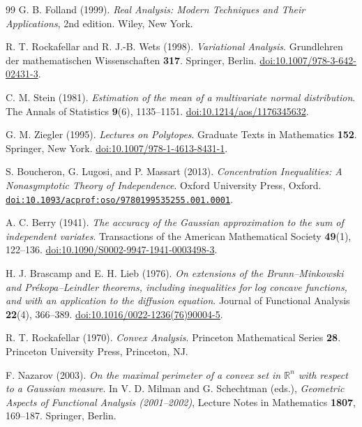 \documentclass[11pt,letterpaper]{article}
\theoremstyle{remark}
\newcommand{\R}{\mathbb R}
\begin{document}
\begin{thebibliography}{99}
G. B. Folland (1999).
\emph{Real Analysis: Modern Techniques and Their Applications}, 2nd edition.
Wiley, New York.

R. T. Rockafellar and R. J.-B. Wets (1998).
\emph{Variational Analysis}.
Grundlehren der mathematischen Wissenschaften \textbf{317}.
Springer, Berlin.
\href{https://doi.org/10.1007/978-3-642-02431-3}{doi:10.1007/978-3-642-02431-3}.

C. M. Stein (1981).
\emph{Estimation of the mean of a multivariate normal distribution}.
The Annals of Statistics \textbf{9}(6), 1135--1151.
\href{https://doi.org/10.1214/aos/1176345632}{doi:10.1214/aos/1176345632}.

G. M. Ziegler (1995).
\emph{Lectures on Polytopes}.
Graduate Texts in Mathematics \textbf{152}. Springer, New York.
\href{https://doi.org/10.1007/978-1-4613-8431-1}{doi:10.1007/978-1-4613-8431-1}.

S. Boucheron, G. Lugosi, and P. Massart (2013).
\emph{Concentration Inequalities: A Nonasymptotic Theory of Independence}.
Oxford University Press, Oxford.
\href{https://doi.org/10.1093/acprof:oso/9780199535255.001.0001}{\nolinkurl{doi:10.1093/acprof:oso/9780199535255.001.0001}}.

A. C. Berry (1941).
\emph{The accuracy of the Gaussian approximation to the sum of independent variates}.
Transactions of the American Mathematical Society \textbf{49}(1), 122--136.
\href{https://doi.org/10.1090/S0002-9947-1941-0003498-3}{doi:10.1090/S0002-9947-1941-0003498-3}.

H. J. Brascamp and E. H. Lieb (1976).
\emph{On extensions of the Brunn--Minkowski and Pr\'ekopa--Leindler
theorems, including inequalities for log concave functions, and with
an application to the diffusion equation}.
Journal of Functional Analysis \textbf{22}(4), 366--389.
\href{https://doi.org/10.1016/0022-1236(76)90004-5}{doi:10.1016/0022-1236(76)90004-5}.

R. T. Rockafellar (1970).
\emph{Convex Analysis}.
Princeton Mathematical Series \textbf{28}.
Princeton University Press, Princeton, NJ.

F. Nazarov (2003).
\emph{On the maximal perimeter of a convex set in \(\R^n\)
with respect to a Gaussian measure}.
In V. D. Milman and G. Schechtman (eds.),
\emph{Geometric Aspects of Functional Analysis (2001--2002)},
Lecture Notes in Mathematics \textbf{1807}, 169--187.
Springer, Berlin.


\end{thebibliography}
\end{document}
